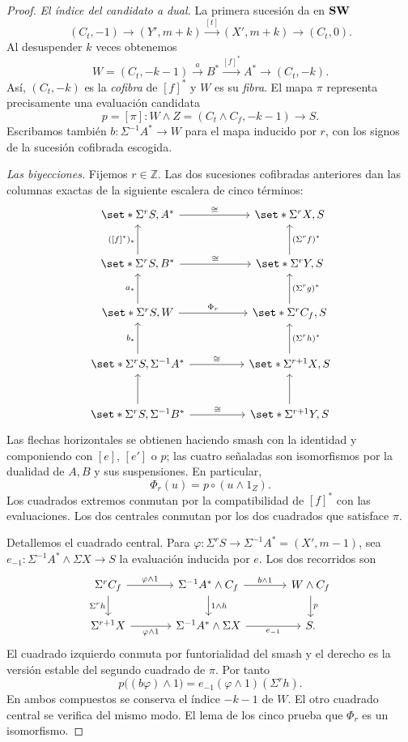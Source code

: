 \begin{proof}
\emph{El índice del candidato a dual.} La primera sucesión da en $\mathbf{SW}$
\[
(C_t,-1)\longrightarrow(Y',m+k)\xrightarrow{[t]}(X',m+k)\longrightarrow(C_t,0).
\]
Al desuspender $k$ veces obtenemos
\[
W=(C_t,-k-1)\xrightarrow{a}B^*\xrightarrow{[f]^*}A^*\longrightarrow(C_t,-k).
\]
Así, $(C_t,-k)$ es la \emph{cofibra} de $[f]^*$ y $W$ es su \emph{fibra}. El mapa $\pi$ representa precisamente una evaluación candidata
\[
p=[\pi]\colon W\wedge Z=(C_t\wedge C_f,-k-1)\longrightarrow S.
\]
Escribamos también $b\colon\Sigma^{-1}A^*\to W$ para el mapa inducido por $r$, con los signos de la sucesión cofibrada escogida.

\emph{Las biyecciones.} Fijemos $r\in\mathbb Z$. Las dos sucesiones cofibradas anteriores dan las columnas exactas de la siguiente escalera de cinco términos:
\[
\begin{tikzcd}[column sep=huge,row sep=large]
\set*{\Sigma^rS,A^*} \arrow[r,"\cong"] & \set*{\Sigma^rX,S}\\
\set*{\Sigma^rS,B^*} \arrow[u,"{([f]^*)_*}"] \arrow[r,"\cong"] & \set*{\Sigma^rY,S} \arrow[u,"(\Sigma^rf)^*"']\\
\set*{\Sigma^rS,W} \arrow[u,"a_*"] \arrow[r,"\Phi_r"] & \set*{\Sigma^rC_f,S} \arrow[u,"(\Sigma^rg)^*"']\\
\set*{\Sigma^rS,\Sigma^{-1}A^*} \arrow[u,"b_*"] \arrow[r,"\cong"] & \set*{\Sigma^{r+1}X,S} \arrow[u,"(\Sigma^rh)^*"']\\
\set*{\Sigma^rS,\Sigma^{-1}B^*} \arrow[u] \arrow[r,"\cong"] & \set*{\Sigma^{r+1}Y,S} \arrow[u]
\end{tikzcd}
\]
Las flechas horizontales se obtienen haciendo smash con la identidad y componiendo con $[e]$, $[e']$ o $p$; las cuatro señaladas son isomorfismos por la dualidad de $A,B$ y sus suspensiones. En particular,
\[
\Phi_r(u)=p\circ(u\wedge1_Z).
\]
Los cuadrados extremos conmutan por la compatibilidad de $[f]^*$ con las evaluaciones. Los dos centrales conmutan por los dos cuadrados que satisface $\pi$.

Detallemos el cuadrado central. Para $\varphi\colon\Sigma^rS\to\Sigma^{-1}A^*=(X',m-1)$, sea $e_{-1}\colon\Sigma^{-1}A^*\wedge\Sigma X\to S$ la evaluación inducida por $e$. Los dos recorridos son
\[
\begin{tikzcd}[column sep=large]
\Sigma^r C_f \arrow[r,"\varphi\wedge1"] \arrow[d,"\Sigma^rh"'] & \Sigma^{-1}A^*\wedge C_f \arrow[r,"b\wedge1"] \arrow[d,"1\wedge h"] & W\wedge C_f \arrow[d,"p"]\\
\Sigma^{r+1}X \arrow[r,"\varphi\wedge1"'] & \Sigma^{-1}A^*\wedge\Sigma X \arrow[r,"e_{-1}"'] & S.
\end{tikzcd}
\]
El cuadrado izquierdo conmuta por funtorialidad del smash y el derecho es la versión estable del segundo cuadrado de $\pi$. Por tanto
\[
p\bigl((b\varphi)\wedge1\bigr)
=e_{-1}(\varphi\wedge1)(\Sigma^rh).
\]
En ambos compuestos se conserva el índice $-k-1$ de $W$. El otro cuadrado central se verifica del mismo modo. El lema de los cinco prueba que $\Phi_r$ es un isomorfismo.


\end{proof}
